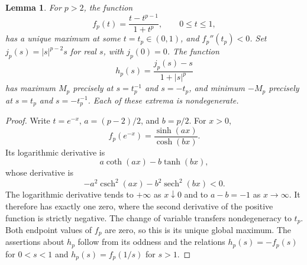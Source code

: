 \documentclass[11pt,a4paper]{article}
\newtheorem{lemma}[theorem]{Lemma}
\theoremstyle{remark}
\begin{document}
\begin{lemma}\label{lem:935-scalar}
For $p>2$, the function
\[
 f_p(t)=\frac{t-t^{p-1}}{1+t^p},\qquad 0\le t\le1,
\]
has a unique maximum at some $t=t_p\in(0,1)$, and $f_p''(t_p)<0$.
Set $j_p(s)=|s|^{p-2}s$ for real $s$, with $j_p(0)=0$. The function
\[
 h_p(s)=\frac{j_p(s)-s}{1+|s|^p}
\]
has maximum $M_p$ precisely at $s=t_p^{-1}$ and $s=-t_p$, and minimum
$-M_p$ precisely at $s=t_p$ and $s=-t_p^{-1}$. Each of these extrema is
nondegenerate.
\end{lemma}
\begin{proof}
Write $t=e^{-x}$, $a=(p-2)/2$, and $b=p/2$. For $x>0$,
\[
 f_p(e^{-x})=\frac{\sinh(ax)}{\cosh(bx)}.
\]
Its logarithmic derivative is
\[
 a\coth(ax)-b\tanh(bx),
\]
whose derivative is
\[
 -a^2\operatorname{csch}^2(ax)-b^2\operatorname{sech}^2(bx)<0.
\]
The logarithmic derivative tends to $+\infty$ as $x\downarrow0$ and to
$a-b=-1$ as $x\to\infty$. It therefore has exactly one zero, where the
second derivative of the positive function is strictly negative. The
change of variable transfers nondegeneracy to $t_p$. Both endpoint values
of $f_p$ are zero, so this is its unique global maximum.
The assertions about $h_p$ follow from its oddness and the relations
$h_p(s)=-f_p(s)$ for $0<s<1$ and $h_p(s)=f_p(1/s)$ for $s>1$.
\end{proof}
\end{document}
